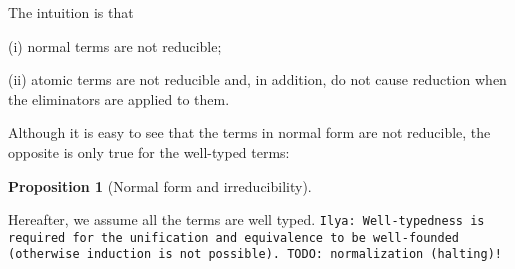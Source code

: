 \documentclass[a4,natbib=false]{article}
\newtheorem{definition}{Definition}
\newtheorem{proposition}{Proposition}
\newcommand{\ilyam}[1]{{\color{red} \texttt{Ilya:  #1}}}
\newcommand{\bnfalt}{\;\;|\;\;}
\newcommand{\fun}[2]{\lambda {#1}.\,{#2}}
\newcommand{\letname}{\mathsf{let}}
\newcommand{\dletname}{\mathsf{dlet}}
\newcommand{\letval}[3]{\letname\; {#1} \,:=\, {#2} \;\mathsf{in}\; {#3}}
\newcommand{\dletval}[3]{\dletname\; {#1} \,:=\, {#2} \;\mathsf{in}\; {#3}}
\newcommand{\pair}[2]{\left\langle{#1}, {#2}\right\rangle}
\newcommand{\valtocomp}[1]{\uparrow \hspace{-2pt} #1}
\newcommand{\pitype}[2]{\Pi {#1}.\,#2}
\newcommand{\foralltype}[2]{\forall {#1}.\,#2}
\newcommand{\refl}{\mathsf{refl}}
\newcommand{\force}[1]{\mathsf{force}\,{#1}}
\newcommand{\return}[1]{\mathsf{return}\,{#1}}
\newcommand{\thunk}[1]{\{{#1}\}}
\newcommand{\recsigmaname}{\mathsf{rec}_{\Sigma}}
\newcommand{\recsigma}[3]{\recsigmaname^{#2}({#1},{#3})}
\newcommand{\receqname}{\mathsf{rec}_{\mathsf{eq}}}
\newcommand{\receq}[3]{\receqname^{#2}({#1},{#3})}
\newcommand{\reduces}[2]{{#1} \rightarrow {#2}}
\newcommand{\judgeSnf}[1]{{#1}\,\mathsf{NF}}
\newcommand{\Infer}[3]{\inferrule*[right={#1}]{#2}{#3}}
\begin{document}
The intuition is that
\begin{enumerate*}
\item[(i)] normal terms are not reducible;
\item[(ii)] atomic terms are not reducible and, in addition, do not cause
  reduction when the eliminators are applied to them.
\end{enumerate*}

Although it is easy to see that the terms in normal form are not reducible,
the opposite is only true for the well-typed terms:

\begin{proposition}[Normal form and irreducibility]
  \label{prop:nf-irred}
\end{proposition}

Hereafter, we assume all the terms are well typed.
\ilyam{Well-typedness is required for the unification and equivalence to be
  well-founded (otherwise induction is not possible). TODO: normalization (halting)!}




\end{document}
